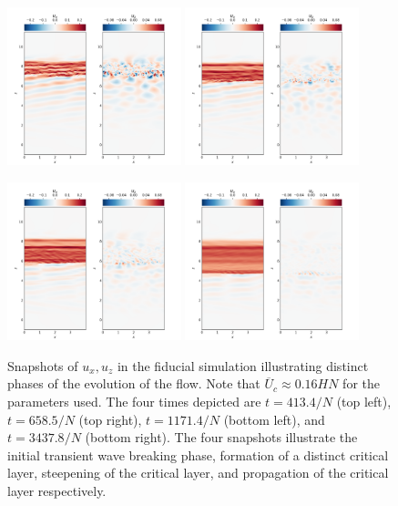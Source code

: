 \documentclass[
        fleqn,
        usenatbib,
    ]{mnras}
\begin{document}
\begin{figure}
    \includegraphics[width=0.45\textwidth]{plots/yubo_000054.png}\hfil
    \includegraphics[width=0.45\textwidth]{plots/yubo_000086.png}

    \includegraphics[width=0.45\textwidth]{plots/yubo_000153.png}\hfil
    \includegraphics[width=0.45\textwidth]{plots/yubo_000451.png}
    \caption{Snapshots of $u_x, u_z$ in the fiducial simulation illustrating
    distinct phases of the evolution of the flow. Note that $\overline{U}_c
    \approx 0.16HN$ for the parameters used. The four times depicted are $t =
    413.4/N$ (top left), $t = 658.5/N$ (top right), $t = 1171.4/N$ (bottom
    left), and $t = 3437.8/N$ (bottom right). The four snapshots illustrate the
    initial transient wave breaking phase, formation of a distinct critical
    layer, steepening of the critical layer, and propagation of the critical
    layer respectively.}\label{fig:snapshots}
\end{figure}
\end{document}
